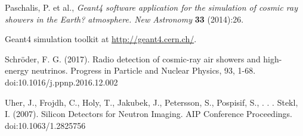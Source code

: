 \begin{thebibliography}{9}
  Paschalis, P. et al., \textit{Geant4 software application for the simulation of cosmic ray showers in the Earth? atmosphere. New Astronomy} {\bf 33} (2014):26.

  Geant4 simulation toolkit at \url{http://geant4.cern.ch/}.

  Schröder, F. G. (2017). Radio detection of cosmic-ray air showers and high-energy neutrinos. Progress in Particle and Nuclear Physics, 93, 1-68. doi:10.1016/j.ppnp.2016.12.002

  Uher, J., Frojdh, C., Holy, T., Jakubek, J., Petersson, S., Pospisif, S., . . . Stekl, I. (2007). Silicon Detectors for Neutron Imaging. AIP Conference Proceedings. doi:10.1063/1.2825756

  

    



	
 
 






\end{thebibliography}
